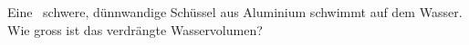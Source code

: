 Eine \mSO\ schwere, dünnwandige Schüssel aus Aluminium schwimmt auf dem Wasser. Wie gross ist das verdrängte Wasservolumen?
